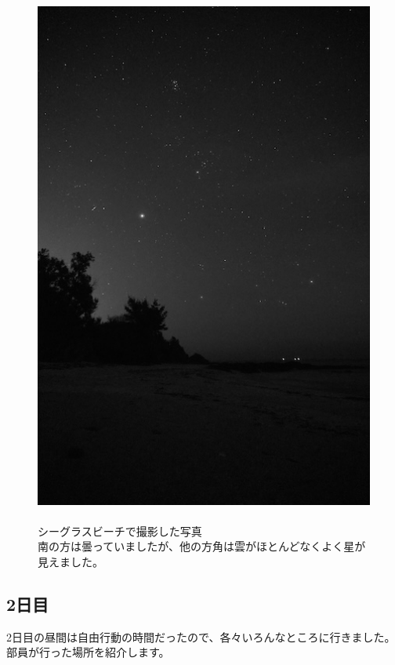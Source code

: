 \documentclass[../main]{subfiles}
\begin{document}
\begin{figure}[H]
  \begin{minipage}[b]{0.38\columnwidth}
    \caption{\\
    シーグラスビーチで撮影した写真\\
    南の方は曇っていましたが、他の方角は雲がほとんどなくよく星が見えました。
    }
  \end{minipage}
  \hspace{0.04\columnwidth}
  \begin{minipage}[b]{0.58\columnwidth}
    \centering
    \includegraphics[width=\columnwidth]{figure/1nitimeyoru.jpg}
  \end{minipage}
\end{figure}


\subsection{2日目}
2日目の昼間は自由行動の時間だったので、各々いろんなところに行きました。部員が行った場所を紹介します。\\
\end{document}
